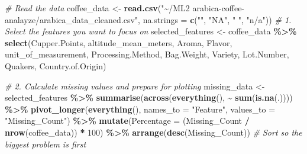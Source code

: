 \documentclass[
]{article}
\newenvironment{Shaded}{\begin{snugshade}}{\end{snugshade}}
\newcommand{\AttributeTok}[1]{\textcolor[rgb]{0.13,0.29,0.53}{#1}}
\newcommand{\CommentTok}[1]{\textcolor[rgb]{0.56,0.35,0.01}{\textit{#1}}}
\newcommand{\DecValTok}[1]{\textcolor[rgb]{0.00,0.00,0.81}{#1}}
\newcommand{\FunctionTok}[1]{\textcolor[rgb]{0.13,0.29,0.53}{\textbf{#1}}}
\newcommand{\NormalTok}[1]{#1}
\newcommand{\OtherTok}[1]{\textcolor[rgb]{0.56,0.35,0.01}{#1}}
\newcommand{\SpecialCharTok}[1]{\textcolor[rgb]{0.81,0.36,0.00}{\textbf{#1}}}
\newcommand{\StringTok}[1]{\textcolor[rgb]{0.31,0.60,0.02}{#1}}
\begin{document}
\begin{Shaded}
\begin{Highlighting}[]
\CommentTok{\# Read the data}
\NormalTok{coffee\_data }\OtherTok{\textless{}{-}} \FunctionTok{read.csv}\NormalTok{(}\StringTok{"\textasciitilde{}/ML2 arabica{-}coffee{-}analayze/arabica\_data\_cleaned.csv"}\NormalTok{, }\AttributeTok{na.strings =} \FunctionTok{c}\NormalTok{(}\StringTok{""}\NormalTok{, }\StringTok{"NA"}\NormalTok{, }\StringTok{" "}\NormalTok{, }\StringTok{"n/a"}\NormalTok{))}
\CommentTok{\# 1. Select the features you want to focus on}
\NormalTok{selected\_features }\OtherTok{\textless{}{-}}\NormalTok{ coffee\_data }\SpecialCharTok{\%\textgreater{}\%} 
  \FunctionTok{select}\NormalTok{(Cupper.Points, altitude\_mean\_meters, Aroma, Flavor, unit\_of\_measurement, Processing.Method, }
\NormalTok{         Bag.Weight, Variety, Lot.Number, Quakers, Country.of.Origin)}

\CommentTok{\# 2. Calculate missing values and prepare for plotting}
\NormalTok{missing\_data }\OtherTok{\textless{}{-}}\NormalTok{ selected\_features }\SpecialCharTok{\%\textgreater{}\%}
  \FunctionTok{summarise}\NormalTok{(}\FunctionTok{across}\NormalTok{(}\FunctionTok{everything}\NormalTok{(), }\SpecialCharTok{\textasciitilde{}} \FunctionTok{sum}\NormalTok{(}\FunctionTok{is.na}\NormalTok{(.)))) }\SpecialCharTok{\%\textgreater{}\%}
  \FunctionTok{pivot\_longer}\NormalTok{(}\FunctionTok{everything}\NormalTok{(), }\AttributeTok{names\_to =} \StringTok{"Feature"}\NormalTok{, }\AttributeTok{values\_to =} \StringTok{"Missing\_Count"}\NormalTok{) }\SpecialCharTok{\%\textgreater{}\%}
  \FunctionTok{mutate}\NormalTok{(}\AttributeTok{Percentage =}\NormalTok{ (Missing\_Count }\SpecialCharTok{/} \FunctionTok{nrow}\NormalTok{(coffee\_data)) }\SpecialCharTok{*} \DecValTok{100}\NormalTok{) }\SpecialCharTok{\%\textgreater{}\%}
  \FunctionTok{arrange}\NormalTok{(}\FunctionTok{desc}\NormalTok{(Missing\_Count)) }\CommentTok{\# Sort so the biggest problem is first}


\end{Highlighting}
\end{Shaded}
\end{document}
